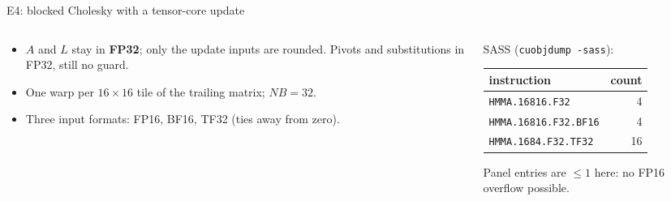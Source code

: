 \documentclass[aspectratio=169,10pt,xcolor=table]{beamer}
\begin{document}
\begin{frame}{E4: blocked Cholesky with a tensor-core update}
\footnotesize
\centering
{}

\vspace{4mm}\raggedright
\begin{columns}[T]\begin{column}{0.52\textwidth}
\begin{itemize}
\item $A$ and $L$ stay in \textbf{FP32}; only the update inputs are rounded. Pivots and substitutions in FP32, still no guard.
\item One warp per $16{\times}16$ tile of the trailing matrix; $NB=32$.
\item Three input formats: FP16, BF16, TF32 (ties away from zero).
\end{itemize}
\end{column}\begin{column}{0.44\textwidth}
SASS (\texttt{cuobjdump -sass}):\\[1mm]
\begin{tabular}{lr}
\toprule
instruction & count\\
\midrule
\texttt{HMMA.16816.F32} & 4\\
\texttt{HMMA.16816.F32.BF16} & 4\\
\texttt{HMMA.1684.F32.TF32} & 16\\
\bottomrule
\end{tabular}

\vspace{1mm}\scriptsize Panel entries are $\le1$ here: no FP16 overflow possible.
\end{column}\end{columns}
\end{frame}
\end{document}
